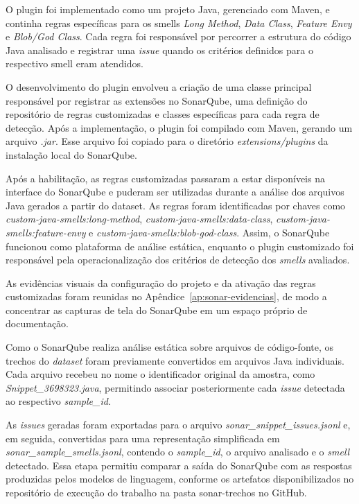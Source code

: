 O plugin foi implementado como um projeto Java, gerenciado com Maven, e continha regras específicas para os smells \textit{Long Method}, \textit{Data Class}, \textit{Feature Envy} e \textit{Blob/God Class}. Cada regra foi responsável por percorrer a estrutura do código Java analisado e registrar uma \textit{issue} quando os critérios definidos para o respectivo smell eram atendidos.

O desenvolvimento do plugin envolveu a criação de uma classe principal responsável por registrar as extensões no SonarQube, uma definição do repositório de regras customizadas e classes específicas para cada regra de detecção. Após a implementação, o plugin foi compilado com Maven, gerando um arquivo \textit{.jar}. Esse arquivo foi copiado para o diretório \textit{extensions/plugins} da instalação local do SonarQube.

Após a habilitação, as regras customizadas passaram a estar disponíveis na interface do SonarQube e puderam ser utilizadas durante a análise dos arquivos Java gerados a partir do dataset. As regras foram identificadas por chaves como \textit{custom-java-smells:long-method}, \textit{custom-java-smells:data-class}, \textit{custom-java-smells:feature-envy} e \textit{custom-java-smells:blob-god-class}. Assim, o SonarQube funcionou como plataforma de análise estática, enquanto o plugin customizado foi responsável pela operacionalização dos critérios de detecção dos \textit{smells} avaliados.

As evidências visuais da configuração do projeto e da ativação das regras customizadas foram reunidas no Apêndice~\ref{ap:sonar-evidencias}, de modo a concentrar as capturas de tela do SonarQube em um espaço próprio de documentação.

Como o SonarQube realiza análise estática sobre arquivos de código-fonte, os trechos do \textit{dataset} foram previamente convertidos em arquivos Java individuais. Cada arquivo recebeu no nome o identificador original da amostra, como \textit{Snippet\_3698323.java}, permitindo associar posteriormente cada \textit{issue} detectada ao respectivo \textit{sample\_id}.

As \textit{issues} geradas foram exportadas para o arquivo \textit{sonar\_snippet\_issues.jsonl} e, em seguida, convertidas para uma representação simplificada em \textit{sonar\_sample\_smells.jsonl}, contendo o \textit{sample\_id}, o arquivo analisado e o \textit{smell} detectado. Essa etapa permitiu comparar a saída do SonarQube com as respostas produzidas pelos modelos de linguagem, conforme os artefatos disponibilizados no repositório de execução do trabalho na pasta sonar-trechos no GitHub.

